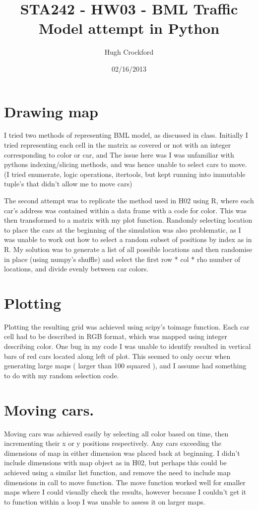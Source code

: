 \documentclass[12pt]{article}
\title{STA242 - HW03 - BML Traffic Model attempt in Python}
\author{Hugh Crockford}
\date{02/16/2013}
\begin{document}
	\maketitle
	\section{Drawing map}
		I tried two methods of representing BML model, as discussed in class.
		Initially I tried representing each cell in the matrix as covered or not with an integer corresponding to color or car, and 
		The issue here was I was unfamiliar with pythons indexing/slicing methods, and was hence unable to select cars to move. (I tried enumerate, logic operations, itertools, but kept running into immutable tuple's that didn't allow me to move cars)


		The second attempt was to replicate the method used in H02 using R, where each car's address was contained within a data frame with a code for color. This was then transformed to a matrix with my plot function.
		Randomly selecting location to place the cars at the beginning of the simulation was also problematic, as I was unable to work out how to select a random subset of positions by index as in R. My solution was to generate a list of all possible locations and then randomise in place (using numpy's shuffle) and select the first row * col * rho number of locations, and divide evenly between car colors.

		\newpage
	\section{Plotting}
		Plotting the resulting grid was achieved using scipy's toimage function. Each car cell had to be described in RGB format, which was mapped using integer describing color.
		One bug in my code I was unable to identify resulted in vertical bars of red cars located along left of plot. This seemed to only occur when generating large maps ( larger than 100 squared ), and I assume had something to do with my random selection code.

	\section{Moving cars.}
		Moving cars was achieved easily by selecting all color based on time, then incrementing their x or y positions respectively. Any cars exceeding the dimensions of map in either dimension was placed back at beginning. 
		I didn't include dimensions with map object as in H02, but perhaps this could be achieved using a similar list function, and remove the need to include map dimensions in call to move function.
		The move function worked well for smaller maps where I could visually check the results, however because I couldn't get it to function within a loop I was unable to assess it on larger maps.
\end{document}
